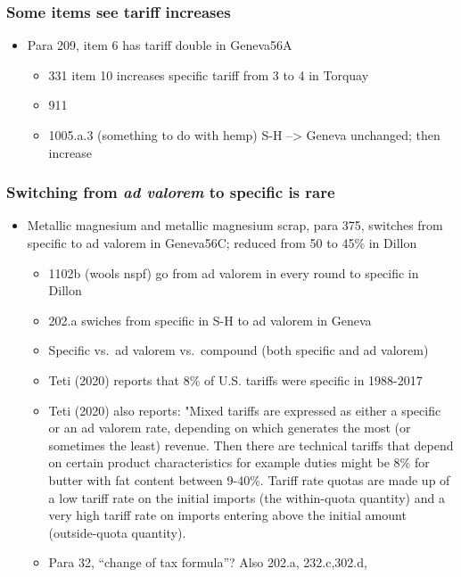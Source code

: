 \documentclass[
  12pt,
]{article}
\providecommand{\tightlist}{%
  \setlength{\itemsep}{0pt}\setlength{\parskip}{0pt}}
\begin{document}
\hypertarget{some-items-see-tariff-increases}{%
\subsubsection{Some items see tariff increases}\label{some-items-see-tariff-increases}}

\begin{itemize}
\item
  Para 209, item 6 has tariff double in Geneva56A

  \begin{itemize}
  \tightlist
  \item
    331 item 10 increases specific tariff from 3 to 4 in Torquay
  \item
    911
  \item
    1005.a.3 (something to do with hemp) S-H --\textgreater{} Geneva unchanged; then increase
  \end{itemize}
\end{itemize}

\hypertarget{switching-from-ad-valorem-to-specific-is-rare}{%
\subsubsection{\texorpdfstring{Switching from \emph{ad valorem} to specific is rare}{Switching from ad valorem to specific is rare}}\label{switching-from-ad-valorem-to-specific-is-rare}}

\begin{itemize}
\item
  Metallic magnesium and metallic magnesium scrap, para 375, switches from specific to ad valorem in Geneva56C; reduced from 50 to 45\% in Dillon

  \begin{itemize}
  \item
    1102b (wools nspf) go from ad valorem in every round to specific in Dillon
  \item
    202.a swiches from specific in S-H to ad valorem in Geneva
  \item
    Specific vs.~ad valorem vs.~compound (both specific and ad valorem)
  \item
    Teti (2020) reports that 8\% of U.S. tariffs were specific in 1988-2017
  \item
    Teti (2020) also reports: "Mixed tariffs are expressed as either a specific or an ad valorem rate, depending on which generates the most (or sometimes the least) revenue. Then there are technical tariffs that depend on certain product characteristics for example duties might be 8\% for butter with fat content between 9-40\%. Tariff rate quotas are made up of a low tariff rate on the initial imports (the within-quota quantity) and a very high tariff rate on imports entering above the initial amount (outside-quota quantity).
  \item
    Para 32, ``change of tax formula''? Also 202.a, 232.c,302.d,
  \end{itemize}
\end{itemize}
\end{document}
